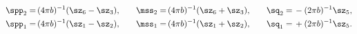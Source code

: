 \begin{equation}
\begin{aligned}
\spp_2=&\,(4\pi b)^{-1}(\sz_6-\sz_3),\\
\spp_1=&\,(4\pi b)^{-1}(\sz_1-\sz_2),
\end{aligned}\qquad
\begin{aligned}
\mss_2=&\,(4\pi b)^{-1}(\sz_6+\sz_3),\\
\mss_1=&\,(4\pi b)^{-1}(\sz_1+\sz_2),
\end{aligned}\qquad
\begin{aligned}
\sq_2=&\,-(2\pi b)^{-1}\sz_5,\\
\sq_1=&\,+(2\pi b)^{-1}\sz_5.
\end{aligned}
\end{equation}

